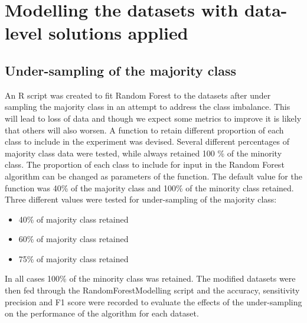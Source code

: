 \section{Modelling the datasets with data-level solutions applied}
\subsection{Under-sampling of the majority class}
An R script was created to fit Random Forest to the datasets after under sampling the majority class in an attempt to address the class imbalance. This will lead to loss of data and though we expect some metrics to improve it is likely that others will also worsen.\newline
A function to retain different proportion of each class to include in the experiment was devised. Several different percentages of majority class data were tested, while always retained 100 \% of the minority class.
The proportion of each class to include for input in the Random Forest algorithm can be changed as parameters of the function.
The default value for the function was 40\% of the majority class and 100\% of the minority class retained.\newline
Three different values were tested for under-sampling of the majority class:
\begin{itemize}
    \item 40\% of majority class retained
    \item 60\% of majority class retained
    \item 75\% of majority class retained
\end{itemize}

In all cases 100\% of the minority class was retained.\newline
The modified datasets were then fed through the RandomForestModelling script and the accuracy, sensitivity precision and F1 score were recorded to evaluate the effects of the under-sampling on the performance of the algorithm for each dataset.\newline

